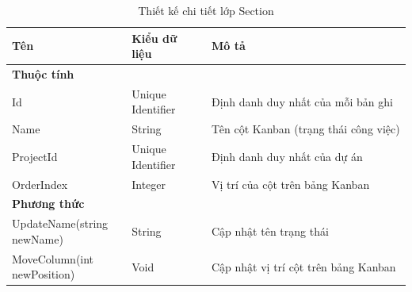 \documentclass[../DoAn.tex]{subfiles}
\begin{document}
\begin{table}[H]
    \renewcommand{\arraystretch}{1.2}
    \centering{}
    \begin{tabular}{p{0.3\linewidth}p{0.2\linewidth}p{0.5\linewidth}}
        \hline
        \textbf{Tên}                & \textbf{Kiểu dữ liệu} & \textbf{Mô tả}                        \\ \hline
        \textbf{Thuộc tính}                                                                         \\ \hline
        Id                          & Unique Identifier     & Định danh duy nhất của mỗi bản ghi    \\ \hline
        Name                        & String                & Tên cột Kanban (trạng thái công việc) \\ \hline
        ProjectId                   & Unique Identifier     & Định danh duy nhất của dự án          \\ \hline
        OrderIndex                  & Integer               & Vị trí của cột trên bảng Kanban       \\ \hline
        \textbf{Phương thức}                                                                        \\ \hline
        UpdateName(string newName)  & String                & Cập nhật tên trạng thái               \\ \hline
        MoveColumn(int newPosition) & Void                  & Cập nhật vị trí cột trên bảng Kanban  \\ \hline
    \end{tabular}
    \renewcommand{\arraystretch}{1}
    \caption{Thiết kế chi tiết lớp Section}
    \label{fig:classdesign_section}
\end{table}

\newpage
\end{document}
